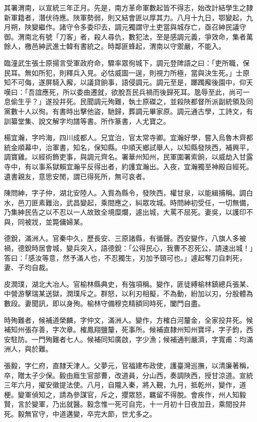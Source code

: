 \begin{pinyinscope}
其署渭南，以宣統三年正月。先是，南方革命軍數起皆不得志，始改計結學生之隸新軍籍者，潛伏待應。陜軍勢弱，則又結會匪以厚其力。八月十九日，鄂變起，九月朔，陜變繼作。諸守令多委印去，調元獨謂守土吏當與城存亡，亟召紳民議守御。渭南北有號「刀客」者，殺人尋仇，數犯法，至是感調元義，爭效命，集者萬餘人，檄邑紳武進士韓有書統之。時鄰匪蜂起，渭南以守禦嚴，不能入。

臨潼武生張士原揚言受軍政府命，驟率眾徇城下，調元登陴語之曰：「吏所職，保民耳。無如所犯，則釋兵入見。必怙威圖一逞，則視力所極，當與決生死。」士原知不可侮，遂屏騎入廨，以議貸餉事，語侵調元。調元至是，躑躅廨後園中，仰天嘆曰：「吾誼應死，所以委曲遷就，欲脫吾民兵禍而後歸死耳。卼辱至此，尚可一息偷生乎？」遂投井死。民聞調元殉難，執士原磔之，並殺陜都督所派副統領及同黨數十人以徇。有書時出擊他盜，馳歸，葬調元畢家原。調元通古學，工詩文，有訓纂堂集、說文解字均譜等書。所作篆書，人尤寶之。

楊宜瀚，字吟海，四川成都人。兄宜治，官太常寺卿。宜瀚好學，嘗入烏魯木齊都統金順幕中，治軍書，知名，保知縣。中順天鄉試舉人，以知縣發陜西，補興平，調寶雞。以經術飾吏事，與調元齊名。署華州知州，民軍圍署索餉，以威劫入甘露寺中，有以事系獄賴宜瀚平反得出者，約護宜瀚出。入夜，宜瀚獨至神殿自經死。遺書親友，意思安閒，謂已得死所，無可哀者。

陳問紳，字子仲，湖北安陸人。入貲為縣令，發陜西，權甘泉，以能緝捕稱。調白水，邑刀匪素難治，武昌變起，乘間應之，糾眾攻城。時問紳初受任，一切無備，乃集紳民告之以不忍以一人故致全境糜爛，遽出城，大罵不屈死。妻吳，以護印不與，同被戕，並斃傭婦某。

德銳，滿洲人。官秦中久，歷長安、三原諸縣，有循聲。西安變作，八旗人多被禍，德銳時居會城，變兵突入，語德銳：「公得民心，我曹不忍死公，請速出城！」答曰：「感汝等意，然予滿人也，不忍獨生，刃加予頸可也。」遽起奪刀自刺死，妻、子均自裁。

皮潤璞，湖北大冶人。官榆林縣典史，有強項稱。變作，匪徒縛榆林鎮總兵張某、中營游擊瑞某送獄，潤璞斥之。群怒，以利刃相擬，不為動，紛加以刃，分股體為數段。妻聞訊，即以身殉。榆林守備穆克精額同時死，闔門自盡。

時殉難者，候補道榮麟，字仲文，滿洲人。變作，方榷白河釐金，全家投井死。候補知州張存善，字次章。榷鳳翔鹽釐，死事所。候補直隸州知州寶坪，字子鈞，西安駐防。一門殉難者七人。候補同知廣啟，字少漁；候補通判嚴濟，字寬甫：均滿洲人，與於難。

張毅，字仁府，直隸天津人。父夢元，官福建布政使，護臺灣巡撫，以清廉著稱，卒，贈太子少保。毅由廕生官部曹，改道員，分山西，奏調陜西，授甘涼道。宣統三年六月，擢安徽提法使。八月，自隴入秦，將入覲，九月，抵乾州，變作，道梗。變軍偵知之，請為參謀官，斥之，攖眾怒，羈留不得脫。會疾作，州人知毅賢，言於變軍，乃出就醫。毅念惟一死可自完，十一月初十日夜加丑，乘間投井死。毅無官守，中道遘變，卒完大節，世尤多之。


\end{pinyinscope}
